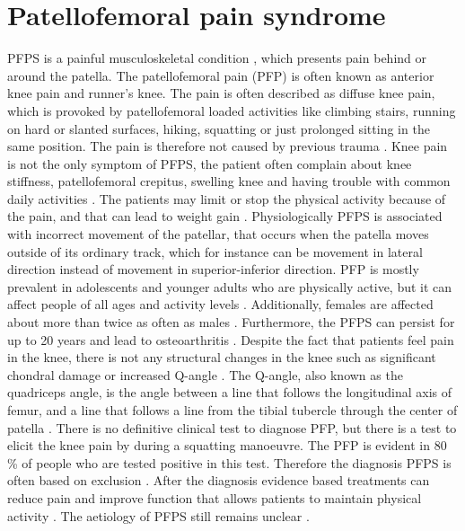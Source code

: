 \section{Patellofemoral pain syndrome}
PFPS is a painful musculoskeletal condition \citep{Maclachlan2017, Smith2015}, which presents pain behind or around the patella. The patellofemoral pain (PFP) is often known as anterior knee pain and runner’s knee. The pain is often described as diffuse knee pain, which is provoked by patellofemoral loaded activities like climbing stairs, running on hard or slanted surfaces, hiking, squatting or just prolonged sitting in the same position.\citep{Crossley2016, Crossley2015, Smith2015, Boudreau2017} The pain is therefore not caused by previous trauma \citep{Crossley2016}.
Knee pain is not the only symptom of PFPS, the patient often complain about knee stiffness, patellofemoral crepitus, swelling knee and having trouble with common daily activities \citep{Martini2012, Crossley2016}. The patients may limit or stop the physical activity because of the pain, and that can lead to weight gain \citep{Petersen2013, Crossley2016}.\newline
\noindent
Physiologically PFPS is associated with incorrect movement of the patellar, that occurs when the patella moves outside of its ordinary track, which for instance can be movement in lateral direction instead of movement in superior-inferior direction.\citep{Martini2012} \newline
\noindent
PFP is mostly prevalent in adolescents and younger adults who are physically active, but it can affect people of all ages and activity levels \citep{Crossley2016, Maclachlan2017, Crossley2015}. Additionally,  females are affected about more than twice as often as males \citep{Petersen2013}. Furthermore, the PFPS can persist for up to 20 years and lead to osteoarthritis \citep{Petersen2013, Crossley2016}.\newline
\noindent
Despite the fact that patients feel pain in the knee, there is not any structural changes in the knee such as significant chondral damage or increased Q-angle \citep{Petersen2013}. The Q-angle, also known as the quadriceps angle, is the angle between a line that follows the longitudinal axis of femur, and a line that follows a line from the tibial tubercle through the center of patella \citep{Dahab2011}. \newline
\noindent
There is no definitive clinical test to diagnose PFP, but there is a test to elicit the knee pain by during a squatting manoeuvre. The PFP is evident in 80 \% of people who are tested positive in this test.\citep{Crossley2016, Crossley2015} Therefore the diagnosis PFPS is often based on exclusion \citep{Petersen2013}. After the diagnosis  evidence based treatments can reduce pain and improve function that allows patients to maintain physical activity \citep{Crossley2015}.
The aetiology of PFPS still remains unclear \citep{Smith2015}. \newpage

